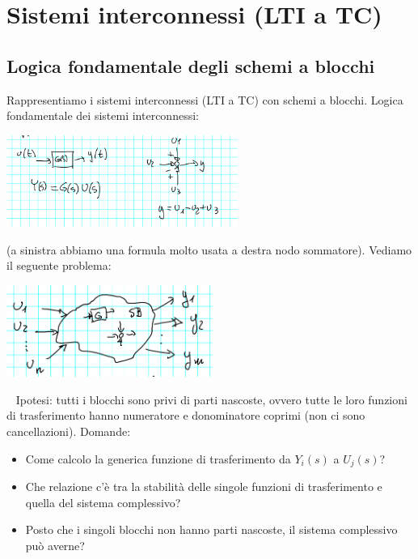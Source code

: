 \section{Sistemi interconnessi (LTI a TC)}
\subsection{Logica fondamentale degli schemi a blocchi}
Rappresentiamo i sistemi interconnessi (LTI a TC) con schemi a blocchi.\newline
\newline
Logica fondamentale dei sistemi interconnessi: 
\begin{center}
    \includegraphics[height=3cm]{../lezione11/img1.PNG}
\end{center}
(a sinistra abbiamo una formula molto usata a destra nodo sommatore).\newline
\newline
Vediamo il seguente problema:
\begin{center}
    \includegraphics[height=3cm]{../lezione11/img2.PNG}
\end{center}
\ \newline
Ipotesi: tutti i blocchi sono privi di parti nascoste, ovvero tutte le loro funzioni di trasferimento hanno numeratore e donominatore coprimi (non ci sono cancellazioni).\newline
Domande:
\begin{itemize}
    \item Come calcolo la generica funzione di trasferimento da $Y_i(s)$ a $U_j(s)$?
    \item Che relazione c'è tra la stabilità delle singole funzioni di trasferimento e quella del sistema complessivo?
    \item Posto che i singoli blocchi non hanno parti nascoste, il sistema complessivo può averne?
\end{itemize}

